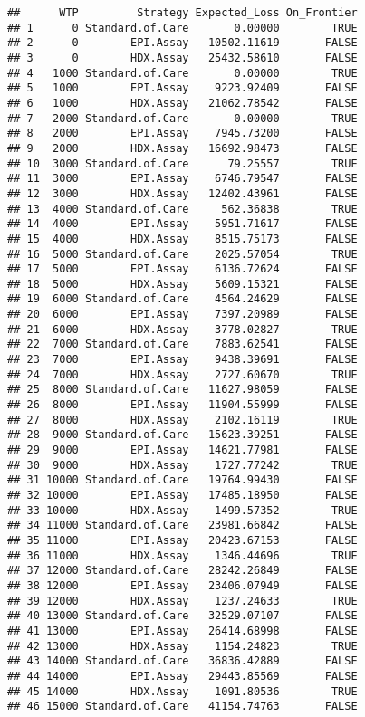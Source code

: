 \documentclass[
]{article}
\begin{document}
\begin{verbatim}
##      WTP         Strategy Expected_Loss On_Frontier
## 1      0 Standard.of.Care       0.00000        TRUE
## 2      0        EPI.Assay   10502.11619       FALSE
## 3      0        HDX.Assay   25432.58610       FALSE
## 4   1000 Standard.of.Care       0.00000        TRUE
## 5   1000        EPI.Assay    9223.92409       FALSE
## 6   1000        HDX.Assay   21062.78542       FALSE
## 7   2000 Standard.of.Care       0.00000        TRUE
## 8   2000        EPI.Assay    7945.73200       FALSE
## 9   2000        HDX.Assay   16692.98473       FALSE
## 10  3000 Standard.of.Care      79.25557        TRUE
## 11  3000        EPI.Assay    6746.79547       FALSE
## 12  3000        HDX.Assay   12402.43961       FALSE
## 13  4000 Standard.of.Care     562.36838        TRUE
## 14  4000        EPI.Assay    5951.71617       FALSE
## 15  4000        HDX.Assay    8515.75173       FALSE
## 16  5000 Standard.of.Care    2025.57054        TRUE
## 17  5000        EPI.Assay    6136.72624       FALSE
## 18  5000        HDX.Assay    5609.15321       FALSE
## 19  6000 Standard.of.Care    4564.24629       FALSE
## 20  6000        EPI.Assay    7397.20989       FALSE
## 21  6000        HDX.Assay    3778.02827        TRUE
## 22  7000 Standard.of.Care    7883.62541       FALSE
## 23  7000        EPI.Assay    9438.39691       FALSE
## 24  7000        HDX.Assay    2727.60670        TRUE
## 25  8000 Standard.of.Care   11627.98059       FALSE
## 26  8000        EPI.Assay   11904.55999       FALSE
## 27  8000        HDX.Assay    2102.16119        TRUE
## 28  9000 Standard.of.Care   15623.39251       FALSE
## 29  9000        EPI.Assay   14621.77981       FALSE
## 30  9000        HDX.Assay    1727.77242        TRUE
## 31 10000 Standard.of.Care   19764.99430       FALSE
## 32 10000        EPI.Assay   17485.18950       FALSE
## 33 10000        HDX.Assay    1499.57352        TRUE
## 34 11000 Standard.of.Care   23981.66842       FALSE
## 35 11000        EPI.Assay   20423.67153       FALSE
## 36 11000        HDX.Assay    1346.44696        TRUE
## 37 12000 Standard.of.Care   28242.26849       FALSE
## 38 12000        EPI.Assay   23406.07949       FALSE
## 39 12000        HDX.Assay    1237.24633        TRUE
## 40 13000 Standard.of.Care   32529.07107       FALSE
## 41 13000        EPI.Assay   26414.68998       FALSE
## 42 13000        HDX.Assay    1154.24823        TRUE
## 43 14000 Standard.of.Care   36836.42889       FALSE
## 44 14000        EPI.Assay   29443.85569       FALSE
## 45 14000        HDX.Assay    1091.80536        TRUE
## 46 15000 Standard.of.Care   41154.74763       FALSE

\end{verbatim}
\end{document}
